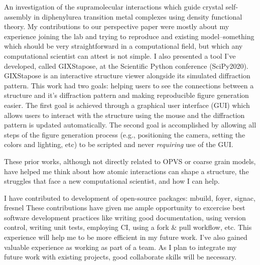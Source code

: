 An investigation of the supramolecular interactions which guide crystal self-assembly in diphenylurea transition metal complexes using density functional theory\cite{Millard2019a}. 
My contributions to our perspective paper were mostly about my experience joining the lab and trying to reproduce and existing model--something which should be very straightforward in a computational field, but which any computational scientist can attest is not simple\cite{Jankowski2019}. 
I also presented a tool I've developed, called GIXStapose, at the Scientific Python conference (SciPy2020). %
GIXStapose is an interactive structure viewer alongside its simulated diffraction pattern.
This work had two goals: helping users to see the connections between a structure and it's diffraction pattern and making reproducible figure generation easier.
The first goal is achieved through a graphical user interface (GUI) which allows users to interact with the structure using the mouse and the diffraction pattern is updated automatically.
The second goal is accomplished by allowing all steps of the figure generation process (e.g., positioning the camera, setting the colors and lighting, etc) to be scripted and never \textit{requiring} use of the GUI.

These prior works, although not directly related to OPVS or coarse grain models, have helped me think about how atomic interactions can shape a structure, the struggles that face a new computational scientist, and how I can help.

I have contributed to development of open-source packages: mbuild, foyer, signac, fresnel
These contributions have given me ample opportunity to excercise best software development practices like writing good documentation, using version control, writing unit tests, employing CI, using a fork \& pull workflow, etc.
This experience will help me to be more efficient in my future work.
I've also gained valuable experience as working as part of a team.
As I plan to integrate my future work with existing projects, good collaborate skills will be necessary.

